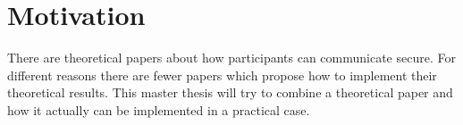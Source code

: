 \section{Motivation}
There are theoretical papers about how participants can communicate secure. For different reasons there are fewer papers which propose how to implement their theoretical results. This master thesis will try to combine a theoretical paper and how it actually can be implemented in a practical case. 